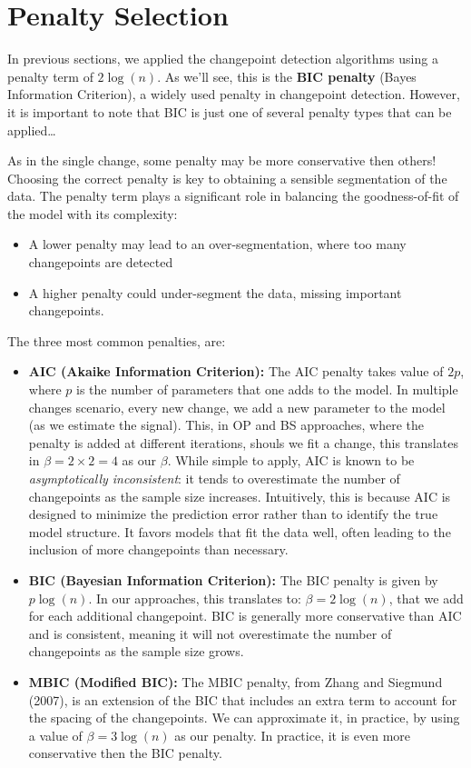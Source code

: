 \documentclass[
  letterpaper,
  DIV=11,
  numbers=noendperiod]{scrreprt}
\providecommand{\tightlist}{%
  \setlength{\itemsep}{0pt}\setlength{\parskip}{0pt}}\usepackage{longtable,booktabs,array}
\begin{document}
\section{Penalty Selection}\label{penalty-selection}

In previous sections, we applied the changepoint detection algorithms
using a penalty term of \(2 \log(n)\). As we'll see, this is the
\textbf{BIC penalty} (Bayes Information Criterion), a widely used
penalty in changepoint detection. However, it is important to note that
BIC is just one of several penalty types that can be applied\ldots{}

As in the single change, some penalty may be more conservative then
others! Choosing the correct penalty is key to obtaining a sensible
segmentation of the data. The penalty term plays a significant role in
balancing the goodness-of-fit of the model with its complexity:

\begin{itemize}
\tightlist
\item
  A lower penalty may lead to an over-segmentation, where too many
  changepoints are detected
\item
  A higher penalty could under-segment the data, missing important
  changepoints.
\end{itemize}

The three most common penalties, are:

\begin{itemize}
\item
  \textbf{AIC (Akaike Information Criterion):} The AIC penalty takes
  value of \(2p\), where \(p\) is the number of parameters that one adds
  to the model. In multiple changes scenario, every new change, we add a
  new parameter to the model (as we estimate the signal). This, in OP
  and BS approaches, where the penalty is added at different iterations,
  shouls we fit a change, this translates in \(\beta = 2 \times 2 = 4\)
  as our \(\beta\). While simple to apply, AIC is known to be
  \emph{asymptotically inconsistent}: it tends to overestimate the
  number of changepoints as the sample size increases. Intuitively, this
  is because AIC is designed to minimize the prediction error rather
  than to identify the true model structure. It favors models that fit
  the data well, often leading to the inclusion of more changepoints
  than necessary.
\item
  \textbf{BIC (Bayesian Information Criterion):} The BIC penalty is
  given by \(p \log(n)\). In our approaches, this translates to:
  \(\beta = 2 \log(n)\), that we add for each additional changepoint.
  BIC is generally more conservative than AIC and is consistent, meaning
  it will not overestimate the number of changepoints as the sample size
  grows.
\item
  \textbf{MBIC (Modified BIC):} The MBIC penalty, from Zhang and
  Siegmund (2007), is an extension of the BIC that includes an extra
  term to account for the spacing of the changepoints. We can
  approximate it, in practice, by using a value of \(\beta = 3 \log(n)\)
  as our penalty. In practice, it is even more conservative then the BIC
  penalty.
\end{itemize}
\end{document}
